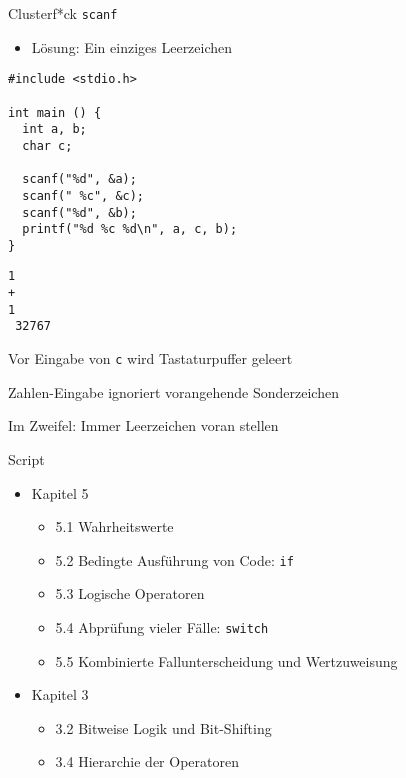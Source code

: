 \begin{frame}[fragile]{Clusterf*ck \texttt{scanf}}
%
\begin{itemize}
\item Lösung: Ein einziges Leerzeichen
\end{itemize}

\begin{tcbraster}[raster columns=2,
                  raster equal height,
                  nobeforeafter,
                  raster column skip=0.2cm]
\begin{codebox}[Szenario]
\begin{verbatim}
#include <stdio.h>

int main () {
  int a, b;
  char c;

  scanf("%d", &a);
  scanf(" %c", &c);
  scanf("%d", &b);
  printf("%d %c %d\n", a, c, b);
}

\end{verbatim}
\end{codebox}
%
\begin{cmdbox}[Ausführungsbeispiel]
\begin{verbatim}
1
+
1 
 32767
\end{verbatim}

\footnotesize
\Thus \textsf{Vor Eingabe von} \texttt{c} \textsf{wird Tastaturpuffer geleert}

\Thus \textsf{Zahlen-Eingabe ignoriert vorangehende Sonderzeichen}

\Thus \textsf{Im Zweifel: Immer Leerzeichen voran stellen}
\end{cmdbox}
\end{tcbraster}
%
\end{frame}


\begin{frame}{Script}
%
\begin{itemize}
\item Kapitel 5
	\begin{itemize}
	\item 5.1 Wahrheitswerte
	\item 5.2 Bedingte Ausführung von Code: \texttt{if}
	\item 5.3 Logische Operatoren
	\item 5.4 Abprüfung vieler Fälle: \texttt{switch}
	\item 5.5 Kombinierte Fallunterscheidung und Wertzuweisung
	\end{itemize}
\item Kapitel 3
	\begin{itemize}
	\item 3.2 Bitweise Logik und Bit-Shifting
	\item 3.4 Hierarchie der Operatoren
	\end{itemize}
\end{itemize}
%
\end{frame}

